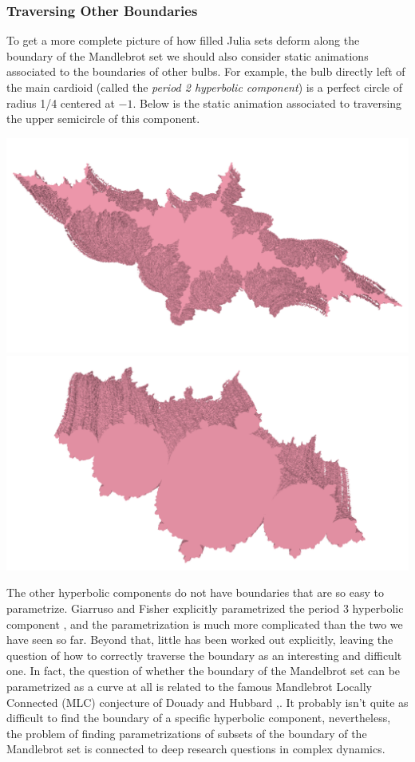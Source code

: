\documentclass[12 pt]{article}
\begin{document}
\subsubsection{Traversing Other Boundaries}
To get a more complete picture of how filled Julia sets deform along the boundary of the Mandlebrot set we should also consider static animations associated to the boundaries of other bulbs.  For example, the bulb directly left of the main cardioid (called the \textit{period 2 hyperbolic component}) is a perfect circle of radius 1/4 centered at $-1$.  Below is the static animation associated to traversing the upper semicircle of this component.
    \begin{center}
        \includegraphics[width=.3\paperwidth]{images/circle1.png}\hspace{10pt}
        \includegraphics[width=.3\paperwidth]{images/circle2.png}
    \end{center}
    The other hyperbolic components do not have boundaries that are so easy to parametrize.  Giarruso and Fisher explicitly parametrized the period 3 hyperbolic component \cite{period3}, and the parametrization is much more complicated than the two we have seen so far.  Beyond that, little has been worked out explicitly, leaving the question of how to correctly traverse the boundary as an interesting and difficult one.  In fact, the question of whether the boundary of the Mandelbrot set can be parametrized as a curve at all is related to the famous Mandlebrot Locally Connected (MLC) conjecture of Douady and Hubbard \cite{DHI},\cite{DHII}.  It probably isn't quite as difficult to find the boundary of a specific hyperbolic component, nevertheless, the problem of finding parametrizations of subsets of the boundary of the Mandlebrot set is connected to deep research questions in complex dynamics.\\
\end{document}
